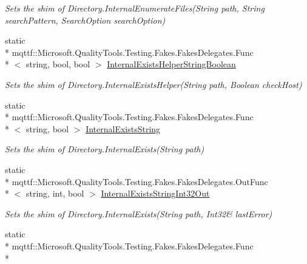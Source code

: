 \begin{DoxyCompactItemize}
\begin{DoxyCompactList}\small\item\em Sets the shim of Directory.\-Internal\-Enumerate\-Files(\-String path, String search\-Pattern, Search\-Option search\-Option)\end{DoxyCompactList}\item 
static \\*
mqttf\-::\-Microsoft.\-Quality\-Tools.\-Testing.\-Fakes.\-Fakes\-Delegates.\-Func\\*
$<$ string, bool, bool $>$ \hyperlink{class_system_1_1_i_o_1_1_fakes_1_1_shim_directory_ae7e840bf96944a3404eb3e6dd6c1280c}{Internal\-Exists\-Helper\-String\-Boolean}
\begin{DoxyCompactList}\small\item\em Sets the shim of Directory.\-Internal\-Exists\-Helper(\-String path, Boolean check\-Host)\end{DoxyCompactList}\item 
static \\*
mqttf\-::\-Microsoft.\-Quality\-Tools.\-Testing.\-Fakes.\-Fakes\-Delegates.\-Func\\*
$<$ string, bool $>$ \hyperlink{class_system_1_1_i_o_1_1_fakes_1_1_shim_directory_a2d445f4638c4f673403056d0097e4c12}{Internal\-Exists\-String}
\begin{DoxyCompactList}\small\item\em Sets the shim of Directory.\-Internal\-Exists(\-String path)\end{DoxyCompactList}\item 
static \\*
mqttf\-::\-Microsoft.\-Quality\-Tools.\-Testing.\-Fakes.\-Fakes\-Delegates.\-Out\-Func\\*
$<$ string, int, bool $>$ \hyperlink{class_system_1_1_i_o_1_1_fakes_1_1_shim_directory_aab4b55c6bfa6fd782a7db1b96e2d7e80}{Internal\-Exists\-String\-Int32\-Out}
\begin{DoxyCompactList}\small\item\em Sets the shim of Directory.\-Internal\-Exists(String path, Int32\& last\-Error)\end{DoxyCompactList}\item 
static \\*
mqttf\-::\-Microsoft.\-Quality\-Tools.\-Testing.\-Fakes.\-Fakes\-Delegates.\-Func\\*

\end{DoxyCompactItemize}
